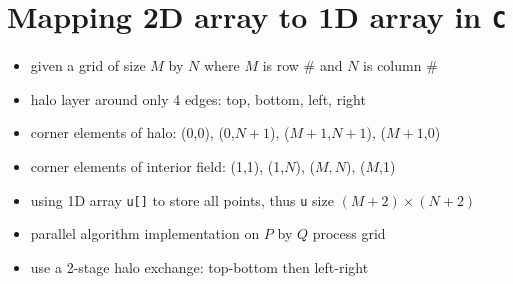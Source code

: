 \section*{Mapping 2D array to 1D array in \texttt{C}}
\begin{itemize}
\item given a grid of size $M$ by $N$ where $M$ is row $\#$ and $N$ is column $\#$
\item halo layer around only 4 edges: top, bottom, left, right
\item corner elements of halo: (0,0), (0,$N+1$), ($M+1$,$N+1$), ($M+1$,0)
\item corner elements of interior field: (1,1), (1,$N$), ($M,N$), ($M$,1)
\item using 1D array \texttt{u[]} to store all points, thus \texttt{u} size $(M+2)\times(N+2)$
\item parallel algorithm implementation on $P$ by $Q$ process grid
\item use a 2-stage halo exchange: top-bottom then left-right
\end{itemize}
